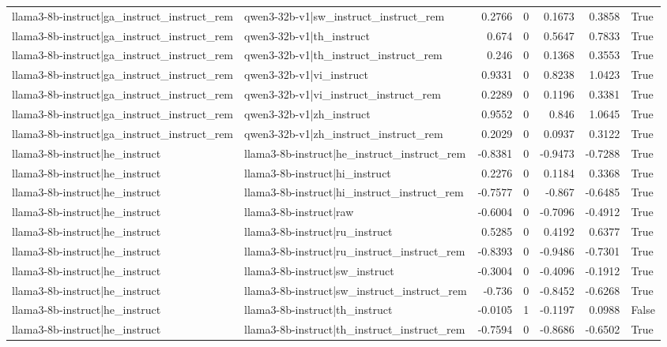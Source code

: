 \begin{table}
\begin{tabular}{l l r r r r l}
llama3-8b-instruct|ga_instruct_instruct_rem & qwen3-32b-v1|sw_instruct_instruct_rem & 0.2766 & 0 & 0.1673 & 0.3858 & True \\
llama3-8b-instruct|ga_instruct_instruct_rem & qwen3-32b-v1|th_instruct & 0.674 & 0 & 0.5647 & 0.7833 & True \\
llama3-8b-instruct|ga_instruct_instruct_rem & qwen3-32b-v1|th_instruct_instruct_rem & 0.246 & 0 & 0.1368 & 0.3553 & True \\
llama3-8b-instruct|ga_instruct_instruct_rem & qwen3-32b-v1|vi_instruct & 0.9331 & 0 & 0.8238 & 1.0423 & True \\
llama3-8b-instruct|ga_instruct_instruct_rem & qwen3-32b-v1|vi_instruct_instruct_rem & 0.2289 & 0 & 0.1196 & 0.3381 & True \\
llama3-8b-instruct|ga_instruct_instruct_rem & qwen3-32b-v1|zh_instruct & 0.9552 & 0 & 0.846 & 1.0645 & True \\
llama3-8b-instruct|ga_instruct_instruct_rem & qwen3-32b-v1|zh_instruct_instruct_rem & 0.2029 & 0 & 0.0937 & 0.3122 & True \\
llama3-8b-instruct|he_instruct & llama3-8b-instruct|he_instruct_instruct_rem & -0.8381 & 0 & -0.9473 & -0.7288 & True \\
llama3-8b-instruct|he_instruct & llama3-8b-instruct|hi_instruct & 0.2276 & 0 & 0.1184 & 0.3368 & True \\
llama3-8b-instruct|he_instruct & llama3-8b-instruct|hi_instruct_instruct_rem & -0.7577 & 0 & -0.867 & -0.6485 & True \\
llama3-8b-instruct|he_instruct & llama3-8b-instruct|raw & -0.6004 & 0 & -0.7096 & -0.4912 & True \\
llama3-8b-instruct|he_instruct & llama3-8b-instruct|ru_instruct & 0.5285 & 0 & 0.4192 & 0.6377 & True \\
llama3-8b-instruct|he_instruct & llama3-8b-instruct|ru_instruct_instruct_rem & -0.8393 & 0 & -0.9486 & -0.7301 & True \\
llama3-8b-instruct|he_instruct & llama3-8b-instruct|sw_instruct & -0.3004 & 0 & -0.4096 & -0.1912 & True \\
llama3-8b-instruct|he_instruct & llama3-8b-instruct|sw_instruct_instruct_rem & -0.736 & 0 & -0.8452 & -0.6268 & True \\
llama3-8b-instruct|he_instruct & llama3-8b-instruct|th_instruct & -0.0105 & 1 & -0.1197 & 0.0988 & False \\
llama3-8b-instruct|he_instruct & llama3-8b-instruct|th_instruct_instruct_rem & -0.7594 & 0 & -0.8686 & -0.6502 & True \\

\end{tabular}
\end{table}
